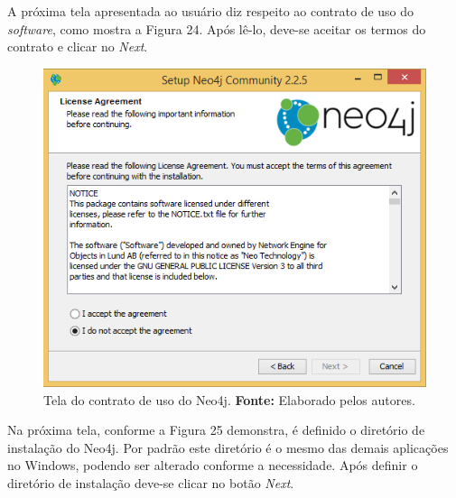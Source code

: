 \par A próxima tela apresentada ao usuário diz respeito ao contrato de uso do \textit{software}, como mostra a Figura 24. Após lê-lo, deve-se aceitar os termos do contrato e clicar no \textit{Next}.

\newpage
\begin{figure}[h!]
	\centerline{\includegraphics[scale=0.4]{./imagens/neo4j-install-step2.png}}
	\caption[Tela do contrato de uso do Neo4j]
	{Tela do contrato de uso do Neo4j. \textbf{Fonte:} Elaborado pelos autores.}
	\label{fig:exemplo1}
\end{figure}

\par Na próxima tela, conforme a Figura 25 demonstra, é definido o diretório de instalação do Neo4j. Por padrão este diretório é o mesmo das demais aplicações no Windows, podendo ser alterado conforme a necessidade. Após definir o diretório de instalação deve-se clicar no botão \textit{Next}.

